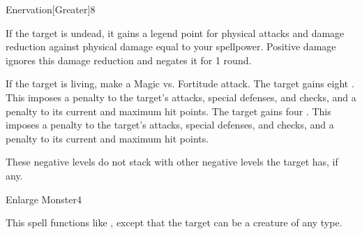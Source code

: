 \begin{spellsection}{Enervation}[Greater]{8}
    \begin{spellheader}
    \end{spellheader}
    \begin{spellcontent}
        \begin{spelltargetinginfo}
        \end{spelltargetinginfo}
        \begin{spelleffects}
            \spelleffect If the target is undead, it gains a legend point for physical attacks and damage reduction against physical damage equal to your spellpower. Positive damage ignores this damage reduction and negates it for 1 round.
            \begin{spellattacktriggered}{If the target is living, make a Magic vs. Fortitude attack.}
                \spellsuccess The target gains eight . This imposes a  penalty to the target's attacks, special defenses, and checks, and a  penalty to its current and maximum hit points.
                \spellsuccess The target gains four . This imposes a  penalty to the target's attacks, special defenses, and checks, and a  penalty to its current and maximum hit points.
            \end{spellattacktriggered}
        \end{spelleffects}
    \end{spellcontent}
    \begin{spellfooter}
        \spellnotes These negative levels do not stack with other negative levels the target has, if any.
        \miscastrandom
    \end{spellfooter}
\end{spellsection}

\begin{spellsection}{Enlarge Monster}{4}
    \begin{spellheader}
    \end{spellheader}
    \begin{spellcontent}
        \begin{spelltargetinginfo}
        \end{spelltargetinginfo}
        \begin{spelleffects}
            \spellspecial This spell functions like , except that the target can be a creature of any type.
        \end{spelleffects}
    \end{spellcontent}
    \begin{spellfooter}
        \spellnotes \sizingspellnotes
        \miscastrandom
    \end{spellfooter}
\end{spellsection}

